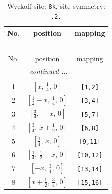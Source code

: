 \documentclass[fleqn,8pt]{jsarticle}
\begin{document}
\begin{longtable}{ccc}
\caption{Wyckoff site: {\tt 8k}, site symmetry: {\tt .2.}}
 \\
 \hline \hline
No. & position & mapping \\ \hline \endfirsthead

\multicolumn{2}{l}{\tablename\ \thetable{}} \\
 \hline \hline
No. & position & mapping \\ \hline \endhead

 \hline \hline
\multicolumn{2}{r}{\footnotesize\it continued ...} \\ \endfoot

 \hline \hline
\multicolumn{2}{r}{} \\ \endlastfoot

1 & $\left[ x,\, \frac{1}{4},\, 0 \right]$ & {\tt [1,2]} \\ \hline
2 & $\left[ \frac{1}{2} - x,\, \frac{1}{4},\, 0 \right]$ & {\tt [3,4]} \\ \hline
3 & $\left[ \frac{3}{4},\, - x,\, 0 \right]$ & {\tt [5,7]} \\ \hline
4 & $\left[ \frac{3}{4},\, x + \frac{1}{2},\, 0 \right]$ & {\tt [6,8]} \\ \hline
5 & $\left[ \frac{1}{4},\, x,\, 0 \right]$ & {\tt [9,11]} \\ \hline
6 & $\left[ \frac{1}{4},\, \frac{1}{2} - x,\, 0 \right]$ & {\tt [10,12]} \\ \hline
7 & $\left[ - x,\, \frac{3}{4},\, 0 \right]$ & {\tt [13,14]} \\ \hline
8 & $\left[ x + \frac{1}{2},\, \frac{3}{4},\, 0 \right]$ & {\tt [15,16]} \\
\end{longtable}
\renewcommand{\arraystretch}{1.2}
\end{document}
